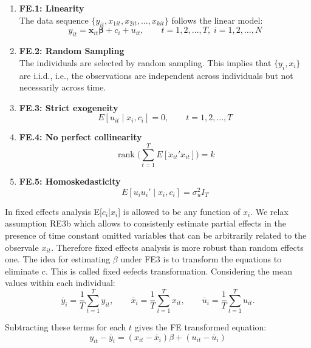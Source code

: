 \begin{enumerate}

    \item \textbf{FE.1: Linearity} \\
    The data sequence $\{y_{it}, x_{1it}, x_{2it}, \ldots, x_{kit}\}$ follows the linear model:
    \[
    y_{it} = \mathbf{x}_{it}\boldsymbol{\beta} + c_i + u_{it}, 
    \qquad 
    t = 1,2,\ldots,T,\; i = 1,2,\ldots,N
    \tag{9}
    \]

    \item \textbf{FE.2: Random Sampling} \\
    The individuals are selected by random sampling.  
    This implies that $\{y_i, x_i\}$ are i.i.d., i.e., the observations are independent across individuals but not necessarily across time.

    \item \textbf{FE.3: Strict exogeneity} \\
    \[
    E[u_{it} \mid x_i, c_i] = 0, \qquad t = 1,2,\ldots,T
    \]

    \item \textbf{FE.4: No perfect collinearity} \\
    \[
    \operatorname{rank}\Bigg(\sum_{t=1}^{T} E[\ddot{x}_{it}' \ddot{x}_{it}]\Bigg) = k
    \]

    \item \textbf{FE.5: Homoskedasticity} \\
    \[
    E[u_i u_i' \mid x_i, c_i] = \sigma_u^2 I_T
    \]

\end{enumerate}

In fixed effects analysis E[$c_i$|$x_i$] is allowed to be any function of \textbf{$x_i$}. We relax assumption RE3b which allows to consistenly estimate partial effects in the presence of time constant omitted variables that can be arbitrarily related to the observale $x_{it}$. Therefore fixed effects analysis is more robust than random effects one. The idea for estimating $\beta$ under FE3 is to transform the equations to eliminate c. This is called fixed eefects transformation. 
Considering the mean values within each individual:
\[
\bar{y}_i = \frac{1}{T} \sum_{t=1}^{T} y_{it}, \qquad
\bar{x}_i = \frac{1}{T} \sum_{t=1}^{T} x_{it}, \qquad
\bar{u}_i = \frac{1}{T} \sum_{t=1}^{T} u_{it}.
\]

Subtracting these terms for each $t$ gives the FE transformed equation:
\[
y_{it} - \bar{y}_i = (x_{it} - \bar{x}_i) \beta + (u_{it} - \bar{u}_i)
\tag{10}
\]

